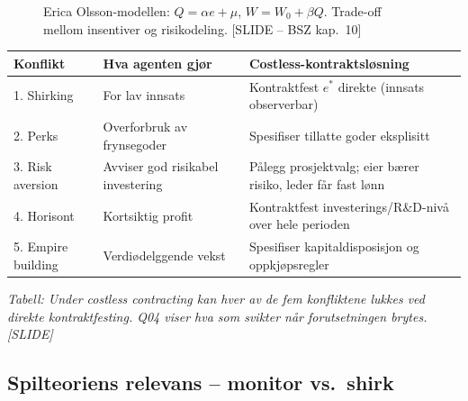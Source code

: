 \begin{figure}[H]
\centering
{}
\caption{Erica Olsson-modellen: $Q=\alpha e+\mu$, $W=W_0+\beta Q$. Trade-off mellom insentiver og risikodeling. [SLIDE -- BSZ kap.\ 10]}
\end{figure}

\begin{center}
\renewcommand{\arraystretch}{1.15}
\begin{tabular}{@{}p{3.4cm}p{4.4cm}p{5.0cm}@{}}
\toprule
\textbf{Konflikt} & \textbf{Hva agenten gjør} & \textbf{Costless-kontraktsløsning} \\
\midrule
1. Shirking & For lav innsats & Kontraktfest $e^\ast$ direkte (innsats observerbar) \\
2. Perks & Overforbruk av frynsegoder & Spesifiser tillatte goder eksplisitt \\
3. Risk aversion & Avviser god risikabel investering & Pålegg prosjektvalg; eier bærer risiko, leder får fast lønn \\
4. Horisont & Kortsiktig profit & Kontraktfest investerings\-/R\&D-nivå over hele perioden \\
5. Empire building & Verdi\-ødelggende vekst & Spesifiser kapital\-disposisjon og oppkjøpsregler \\
\bottomrule
\end{tabular}
\end{center}
\textit{Tabell: Under costless contracting kan hver av de fem konfliktene lukkes ved direkte kontraktfesting. Q04 viser hva som svikter når forutsetningen brytes. [SLIDE]}

\subsection*{Spilteoriens relevans -- monitor vs.\ shirk}

